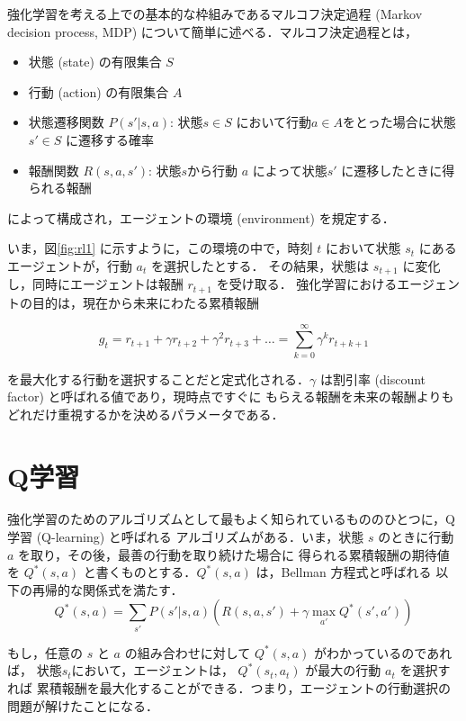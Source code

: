 強化学習を考える上での基本的な枠組みであるマルコフ決定過程 (Markov decision process, MDP) 
について簡単に述べる．マルコフ決定過程とは，
\begin{itemize}
\item 状態 (state) の有限集合 $S$
\item 行動 (action) の有限集合 $A$
\item 状態遷移関数 $P(s'|s,a)$: 状態$s \in S$ において行動$a \in A$をとった場合に状態$s' \in S$ に遷移する確率
\item 報酬関数 $R(s,a,s')$: 状態$s$から行動 $a$ によって状態$s'$ に遷移したときに得られる報酬
\end{itemize}
\noindent
によって構成され，エージェントの環境 (environment) を規定する．

いま，図\ref{fig:rl1} に示すように，この環境の中で，時刻 $t$ において状態 $s_t$ にあるエージェントが，行動 $a_t$ を選択したとする．
その結果，状態は $s_{t+1}$ に変化し，同時にエージェントは報酬 $r_{t+1}$ を受け取る．
強化学習におけるエージェントの目的は，現在から未来にわたる累積報酬

\begin{equation}
g_t = r_{t+1} + \gamma r_{t+2} + \gamma^2 r_{t+3} + \ldots = \sum_{k=0}^{\infty} \gamma^k r_{t+k+1}
\end{equation}

\noindent
を最大化する行動を選択することだと定式化される．$\gamma$ は割引率 (discount factor) 
と呼ばれる値であり，現時点ですぐに
もらえる報酬を未来の報酬よりもどれだけ重視するかを決めるパラメータである．

\section{Q学習}

強化学習のためのアルゴリズムとして最もよく知られているもののひとつに，Q学習 (Q-learning) と呼ばれる
アルゴリズムがある．いま，状態 $s$ のときに行動 $a$ を取り，その後，最善の行動を取り続けた場合に
得られる累積報酬の期待値を $Q^*(s,a)$ と書くものとする．$Q^*(s,a)$ は，Bellman 方程式と呼ばれる
以下の再帰的な関係式を満たす．
\begin{equation}
Q^*(s,a) = \sum_{s'} P(s'| s, a) (R(s, a, s') + \gamma \max_{a'} Q^*(s', a') )
\end{equation}

もし，任意の $s$ と $a$ の組み合わせに対して  $Q^*(s,a)$ がわかっているのであれば，
状態$s_t$において，エージェントは， $Q^*(s_t, a_t)$ が最大の行動 $a_t$ を選択すれば
累積報酬を最大化することができる．つまり，エージェントの行動選択の問題が解けたことになる．

